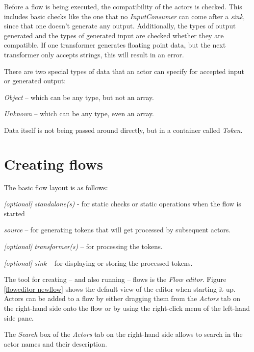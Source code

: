 Before a flow is being executed, the compatibility of the actors is
checked. This includes basic checks like the one that no \textit{InputConsumer}
can come after a \textit{sink}, since that one doesn't generate any output.
Additionally, the types of output generated and the types of generated input are
checked whether they are compatible. If one transformer generates floating
point data, but the next transformer only accepts strings, this will result in
an error.

There are two special types of data that an actor can specify for accepted input
or generated output:
\begin{tight_itemize}
  \item \textit{Object} -- which can be any type, but not an array.
  \item \textit{Unknown} -- which can be any type, even an array.
\end{tight_itemize}

\noindent Data itself is not being passed around directly, but in a container
called \textit{Token}.

\clearpage
\section{Creating flows}
The basic flow layout is as follows:
\begin{tight_itemize}
  \item \textit{[optional]} \textit{standalone(s)} - for static checks or static
  operations when the flow is started
  \item \textit{source} -- for generating tokens that will get processed by
  subsequent actors.
  \item \textit{[optional]} \textit{transformer(s)} -- for processing the
  tokens.
  \item \textit{[optional]} \textit{sink} -- for displaying or storing the
  processed tokens.
\end{tight_itemize}
The tool for creating -- and also running -- flows is the \textit{Flow editor}.
Figure \ref{floweditor-newflow} shows the default view of the editor when
starting it up. Actors can be added to a flow by either dragging them from the
\textit{Actors} tab on the right-hand side onto the flow or by using the
right-click menu of the left-hand side pane.

The \textit{Search} box of the \textit{Actors} tab on the right-hand side allows
to search in the actor names and their description.

